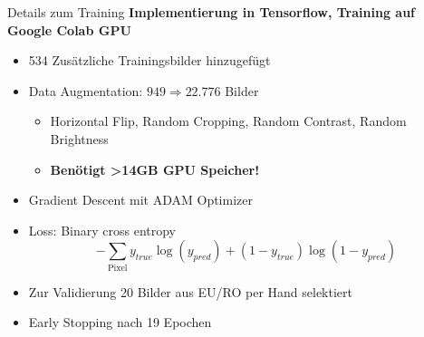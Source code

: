 \begin{frame}{Details zum Training}
    \textbf{Implementierung in Tensorflow, Training auf Google Colab GPU}
    \begin{itemize}
        \item 534 Zus\"atzliche Trainingsbilder hinzugef\"ugt
        \item Data Augmentation: $949 \Rightarrow 22.776$ Bilder
              \begin{itemize}
                  \item Horizontal Flip, Random Cropping, Random Contrast, Random Brightness
                  \item \textbf{Ben\"otigt >14GB GPU Speicher!}
              \end{itemize}
        \item Gradient Descent mit ADAM Optimizer
        \item Loss: Binary cross entropy
              \begin{equation*}
                  -\sum_{\text{Pixel}} y_{true} \log (y_{pred}) + (1 - y_{true}) \log (1 - y_{pred})
              \end{equation*}
        \item Zur Validierung 20 Bilder aus EU/RO per Hand selektiert
        \item \glqq Early Stopping\grqq{} nach 19 Epochen
    \end{itemize}
\end{frame}
